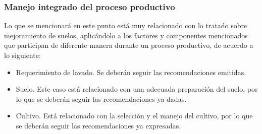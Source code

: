 \subsubsection{Manejo integrado del proceso productivo}
Lo que se mencionará en este punto está muy relacionado con lo tratado sobre
mejoramiento de suelos, aplicándolo a los factores y componentes mencionados
que participan de diferente manera durante un proceso productivo, de acuerdo a lo
siguiente:
\begin{itemize}
    \item Requerimiento de lavado. Se deberán seguir las recomendaciones emitidas.
    \item Suelo. Este caso está relacionado con una adecuada preparación del suelo, por lo que se deberán seguir las recomendaciones ya dadas.
    \item Cultivo. Está relacionado con la selección y el manejo del cultivo, por lo que se deberán seguir las recomendaciones ya expresadas.
\end{itemize}
